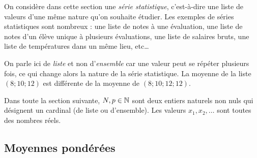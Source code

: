 On considère dans cette section une \emph{série statistique}, c'est-à-dire une liste de valeurs d'une même nature qu'on souhaite étudier.
Les exemples de séries statistiques sont nombreux : une liste de notes à une évaluation, une liste de notes d'un élève unique à plusieurs évaluations, une liste de salaires bruts, une liste de températures dans un même lieu, etc…

On parle ici de \emph{liste} et non d'\emph{ensemble} car une valeur peut se répéter plusieurs fois, ce qui change alors la nature de la série statistique.
La moyenne de la liste $(8; 10; 12)$ est différente de la moyenne de $(8; 10; 12; 12)$.

Dans toute la section suivante, $N, p \in \mathbb{N}$ sont deux entiers naturels non nuls qui désignent un cardinal (de liste ou d'ensemble). 
Les valeurs $x_1, x_2, \dots$ sont toutes des nombres réels.


\subsection{Moyennes pondérées}







